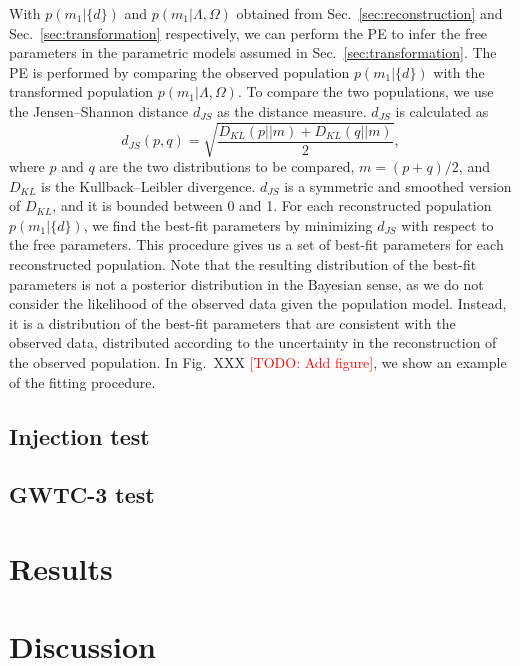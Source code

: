 \documentclass[aps,prd,twocolumn,superscriptaddress,preprintnumbers,nofootinbib,hidelinks]{revtex4-2}
\newcommand{\todo}[1]{\textcolor{red}{[TODO: #1]}}
\begin{document}
With $p(m_1|\{d\})$ and $p(m_1|\Lambda, \Omega)$ obtained from Sec.~\ref{sec:reconstruction} and Sec.~\ref{sec:transformation} respectively, we can perform the \ac{PE} to infer the free parameters in the parametric models assumed in Sec.~\ref{sec:transformation}.
The \ac{PE} is performed by comparing the observed population $p(m_1|\{d\})$ with the transformed population $p(m_1|\Lambda, \Omega)$.
To compare the two populations, we use the Jensen–Shannon distance $d_{JS}$ as the distance measure.
$d_{JS}$ is calculated as
\begin{equation}
    d_{JS}(p, q) = \sqrt{\frac{D_{KL}(p||m) + D_{KL}(q||m)}{2}},
\end{equation}
where $p$ and $q$ are the two distributions to be compared, $m = (p + q) / 2$, and $D_{KL}$ is the Kullback–Leibler divergence.
$d_{JS}$ is a symmetric and smoothed version of $D_{KL}$, and it is bounded between 0 and 1.
For each reconstructed population $p(m_1|\{d\})$, we find the best-fit parameters by minimizing $d_{JS}$ with respect to the free parameters.
This procedure gives us a set of best-fit parameters for each reconstructed population.
Note that the resulting distribution of the best-fit parameters is not a posterior distribution in the Bayesian sense, as we do not consider the likelihood of the observed data given the population model.
Instead, it is a distribution of the best-fit parameters that are consistent with the observed data, distributed according to the uncertainty in the reconstruction of the observed population.
In Fig.~XXX \todo{Add figure}, we show an example of the fitting procedure.

\subsection{Injection test}
\label{sec:injection}

\subsection{GWTC-3 test}
\label{sec:gwtc3}

\section{Results}
\label{sec:results}

\section{Discussion}
\label{sec:discussion}
\end{document}
